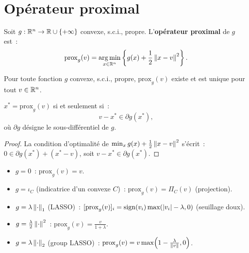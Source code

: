 \section{Op\'erateur proximal}

\begin{definition}
Soit $g : \mathbb{R}^n \to \mathbb{R} \cup \{+\infty\}$ convexe, s.c.i., propre.
L'\textbf{op\'erateur proximal} de $g$ est~:
\[
  \mathrm{prox}_g(v) = \operatorname*{arg\,min}_{x \in \mathbb{R}^n} \left\{
    g(x) + \frac{1}{2} \left\| x - v \right\|^2
  \right\}.
\]
\end{definition}

\begin{proposition}
Pour toute fonction $g$ convexe, s.c.i., propre, $\mathrm{prox}_g(v)$ existe
et est unique pour tout $v \in \mathbb{R}^n$.
\end{proposition}

\begin{theoreme}
$x^* = \mathrm{prox}_g(v)$ si et seulement si~:
\[
  v - x^* \in \partial g(x^*),
\]
o\`u $\partial g$ d\'esigne le sous-diff\'erentiel de $g$.
\end{theoreme}

\begin{proof}
La condition d'optimalit\'e de $\min_x g(x) + \frac{1}{2}\left\| x-v \right\|^2$
s'\'ecrit~: $0 \in \partial g(x^*) + (x^* - v)$, soit
$v - x^* \in \partial g(x^*)$.
\end{proof}

\begin{formules}[title=\textbf{Op\'erateurs proximaux classiques}]
\begin{itemize}
  \item $g = 0$~: $\mathrm{prox}_g(v) = v$.
  \item $g = \iota_C$ (indicatrice d'un convexe $C$)~:
        $\mathrm{prox}_g(v) = \Pi_C(v)$ (projection).
  \item $g = \lambda \left\| \cdot \right\|_1$ (LASSO)~:
        $[\mathrm{prox}_g(v)]_i = \mathrm{sign}(v_i)
        \max(\left| v_i \right| - \lambda, 0)$ (seuillage doux).
  \item $g = \frac{\lambda}{2}\left\| \cdot \right\|^2$~:
        $\mathrm{prox}_g(v) = \frac{v}{1 + \lambda}$.
  \item $g = \lambda \left\| \cdot \right\|_2$ (group LASSO)~:
        $\mathrm{prox}_g(v) = v \max\!\left(1 - \frac{\lambda}{\left\| v \right\|},
        0\right)$.
\end{itemize}
\end{formules}


